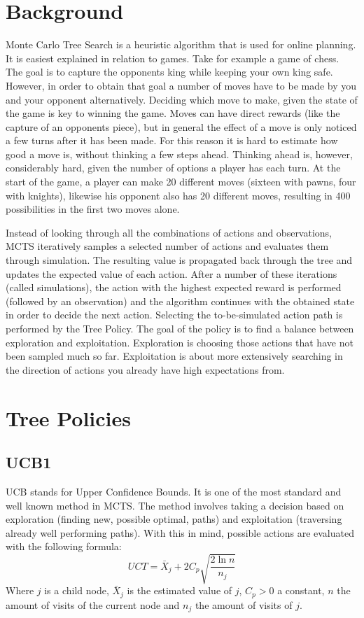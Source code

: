 \documentclass{acm_proc_article-sp}
\begin{document}
\section{Background}

Monte Carlo Tree Search is a heuristic algorithm that is used for online planning. It is easiest explained in relation to games. Take for example a game of chess. The goal is to capture the opponents king while keeping your own king safe. However, in order to obtain that goal a number of moves have to be made by you and your opponent alternatively. Deciding which move to make, given the state of the game is key to winning the game. Moves can have direct rewards (like the capture of an opponents piece), but in general the effect of a move is only noticed a few turns after it has been made. For this reason it is hard to estimate how good a move is, without thinking a few steps ahead. Thinking ahead is, however, considerably hard, given the number of options a player has each turn. At the start of the game, a player can make 20 different moves (sixteen with pawns, four with knights), likewise his opponent also has 20 different moves, resulting in 400 possibilities in the first two moves alone. %

Instead of looking through all the combinations of actions and observations, MCTS iteratively samples a selected number of actions and evaluates them through simulation. The resulting value is propagated back through the tree and updates the expected value of each action. After a number of these iterations (called simulations), the action with the highest expected reward is performed (followed by an observation) and the algorithm continues with the obtained state in order to decide the next action. Selecting the to-be-simulated action path is performed by the Tree Policy. The goal of the policy is to find a balance between exploration and exploitation. Exploration is choosing those actions that have not been sampled much so far. Exploitation is about more extensively searching in the direction of actions you already have high expectations from. 

\section{Tree Policies} 

\subsection{UCB1}
UCB stands for Upper Confidence Bounds. It is one of the most standard and well known method in MCTS. The method involves taking a decision based on exploration (finding new, possible optimal, paths) and exploitation (traversing already well performing paths). With this in mind, possible actions are evaluated with the following formula:
\begin{equation}
UCT = \bar{X}_j + 2 C_p\sqrt{\frac{2 \ln n}{n_j}}
\end{equation}
Where $j$ is a child node, $\bar{X}_j$ is the estimated value of $j$, $C_p > 0$ a constant, $n$ the amount of visits of the current node and $n_j$ the amount of visits of $j$.
\end{document}
